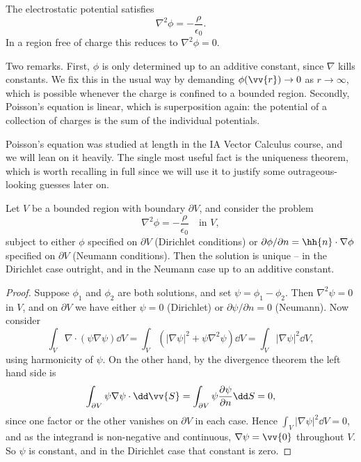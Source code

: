 \begin{proposition}
	The electrostatic potential satisfies
	$$
	\nabla^2 \phi = -\frac{\rho}{\epsilon_0}.
	$$
	In a region free of charge this reduces to  $\nabla^2 \phi = 0$.
\end{proposition}

Two remarks. First, $\phi$ is only determined up to an additive constant, since $\nabla$ kills constants. We fix this in the usual way by demanding $\phi(\vv{r}) \to 0$ as $r \to \infty$, which is possible whenever the charge is confined to a bounded region. Secondly, Poisson's equation is linear, which is superposition again: the potential of a collection of charges is the sum of the individual potentials.

Poisson's equation was studied at length in the IA Vector Calculus course, and we will lean on it heavily. The single most useful fact is the uniqueness theorem, which is worth recalling in full since we will use it to justify some outrageous-looking guesses later on.

\begin{theorem}
	\label{em-thm:uniqueness}
	Let $V$ be a bounded region with boundary $\partial V$, and consider the problem
	$$
	\nabla^2 \phi = -\frac{\rho}{\epsilon_0} \quad \text{in } V,
	$$
	subject to either $\phi$ specified on $\partial V$ (Dirichlet conditions) or $\partial \phi/\partial n = \hh{n}\cdot\nabla\phi$ specified on $\partial V$ (Neumann conditions). Then the solution is unique -- in the Dirichlet case outright, and in the Neumann case up to an additive constant.
\end{theorem}
\begin{proof}
	Suppose $\phi_1$ and $\phi_2$ are both solutions, and set $\psi = \phi_1 - \phi_2$. Then $\nabla^2 \psi = 0$ in $V$, and on $\partial V$ we have either $\psi = 0$ (Dirichlet) or $\partial \psi/\partial n = 0$ (Neumann). Now consider
	$$
	\int_V \nabla\cdot(\psi \nabla \psi)\dd V = \int_V \left(|\nabla \psi|^2 + \psi \nabla^2 \psi\right)\dd V = \int_V |\nabla\psi|^2 \dd V,
	$$
	using harmonicity of $\psi$. On the other hand, by the divergence theorem the left hand side is
	$$
	\int_{\partial V} \psi \nabla \psi \cdot \dd \vv{S} = \int_{\partial V}\psi \frac{\partial \psi}{\partial n}\dd S = 0,
	$$
	since one factor or the other vanishes on $\partial V$ in each case. Hence $\int_V |\nabla\psi|^2 \dd V = 0$, and as the integrand is non-negative and continuous, $\nabla \psi = \vv{0}$ throughout $V$. So $\psi$ is constant, and in the Dirichlet case that constant is zero.
\end{proof}

